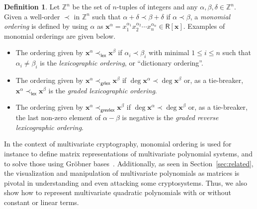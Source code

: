 \documentclass[12pt, a4paper, oneside]{memoir}
\theoremstyle{definition}
\newtheorem{definition}[theorem]{Definition}
\begin{document}
\begin{definition}
  Let $\mathbb{Z}^{n}$ be the set of $n$-tuples of integers and any $\alpha, \beta, \delta \in \mathbb{Z}^{n}$. Given a well-order $\prec$ in $\mathbb{Z}^{n}$ such that $\alpha + \delta \prec \beta + \delta$ if $\alpha \prec \beta$, a \emph{monomial ordering} is defined by using $\alpha$ as $\mathbf{x}^{\alpha} = x_{1}^{\alpha_{1}} x_{2}^{\alpha_{2}} \cdots x_{n}^{\alpha_{n}} \in \mathsf{R}[\mathbf{x}]$. Examples of monomial orderings are given below.
  
  \begin{itemize}
    \item The ordering given by $\mathbf{x}^{\alpha} \prec_{\mathsf{lex}} \mathbf{x}^{\beta}$ if $\alpha_{i} \prec \beta_{i}$ with minimal $1 \leq i \leq n$ such that $\alpha_{i} \neq \beta_{i}$ is the \emph{lexicographic ordering}, or ``dictionary ordering''.
    \item The ordering given by $\mathbf{x}^{\alpha} \prec_{\mathsf{grlex}} \mathbf{x}^{\beta}$ if $\deg \mathbf{x}^{\alpha} \prec \deg \mathbf{x}^{\beta}$ or, as a tie-breaker, $\mathbf{x}^{\alpha} \prec_{\mathsf{lex}} \mathbf{x}^{\beta}$ is the \emph{graded lexicographic ordering}.
    \item The ordering given by $\mathbf{x}^{\alpha} \prec_{\mathsf{grevlex}} \mathbf{x}^{\beta}$ if $\deg \mathbf{x}^{\alpha} \prec \deg \mathbf{x}^{\beta}$ or, as a tie-breaker, the last non-zero element of $\alpha - \beta$ is negative is the \emph{graded reverse lexicographic ordering}.
  \end{itemize}
\end{definition}

In the context of multivariate cryptography, monomial ordering is used for instance to define matrix representations of multivariate polynomial systems, and to solve those using Gröbner bases~\cite[Section 21.4]{Gathen:2013}. Additionally, as seen in Section~\ref{sec:related}, the visualization and manipulation of multivariate polynomials as matrices is pivotal in understanding and even attacking some cryptosystems. Thus, we also show how to represent multivariate quadratic polynomials with or without constant or linear terms.
\end{document}
